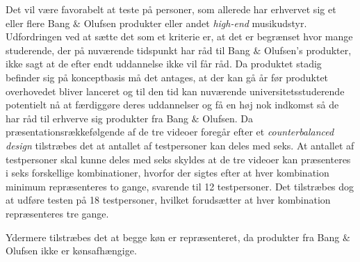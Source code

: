 Det vil være favorabelt at teste på personer, som allerede har erhvervet sig et eller flere Bang $\&$ Olufsen produkter eller andet \textit{high-end} musikudstyr. Udfordringen ved at sætte det som et kriterie er, at det er begrænset hvor mange studerende, der på nuværende tidspunkt har råd til Bang $\&$ Olufsen's produkter, ikke sagt at de efter endt uddannelse ikke vil får råd. Da produktet stadig befinder sig på konceptbasis må det antages, at der kan gå år før produktet overhovedet bliver lanceret og til den tid kan nuværende universitetsstuderende potentielt nå at færdiggøre deres uddannelser og få en høj nok indkomst så de har råd til erhverve sig produkter fra Bang $\&$ Olufsen. \blankline
%        
Da præsentationsrækkefølgende af de tre videoer foregår efter et \textit{counterbalanced design} tilstræbes det at antallet af testpersoner kan deles med seks. At antallet af testpersoner skal kunne deles med seks skyldes at de tre videoer kan præsenteres i seks forskellige kombinationer, hvorfor der sigtes efter at hver kombination minimum repræsenteres to gange, svarende til 12 testpersoner. Det tilstræbes dog at udføre testen på 18 testpersoner, hvilket forudsætter at hver kombination repræsenteres tre gange. 

Ydermere tilstræbes det at begge køn er repræsenteret, da produkter fra Bang $\&$ Olufsen ikke er kønsafhængige. 
  





 
 
 


